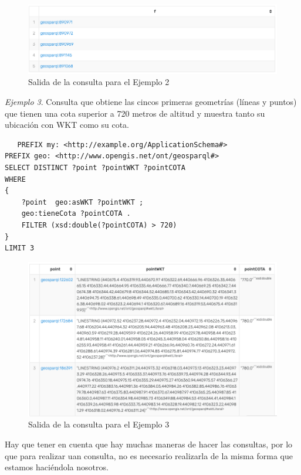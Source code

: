 \begin{figure}[H]
	\centering
	\includegraphics[width=0.9\linewidth]{imagenes/capitulo5/salida4}
	\caption{Salida de la consulta para el Ejemplo 2}
	\label{fig:salida4}
\end{figure}

\textit{Ejemplo 3}. Consulta que obtiene las cincos primeras geometrías (líneas y puntos) que tienen una cota superior a 720 metros de altitud y muestra tanto su ubicación con WKT como su cota.\\

\begin{lstlisting}
   PREFIX my: <http://example.org/ApplicationSchema#>
PREFIX geo: <http://www.opengis.net/ont/geosparql#>
SELECT DISTINCT ?point ?pointWKT ?pointCOTA
WHERE 
{
	?point 	geo:asWKT ?pointWKT ;
	geo:tieneCota ?pointCOTA .
	FILTER (xsd:double(?pointCOTA) > 720)
}
LIMIT 3
\end{lstlisting}


\begin{figure}[H]
	\centering
	\includegraphics[width=0.9\linewidth]{imagenes/capitulo5/salida6}
	\caption{Salida de la consulta para el Ejemplo 3}
	\label{fig:salida6}
\end{figure}



Hay que tener en cuenta que hay muchas maneras de hacer las consultas, por lo que para realizar uan consulta, no es necesario realizarla de la misma forma que estamos haciéndola nosotros.




